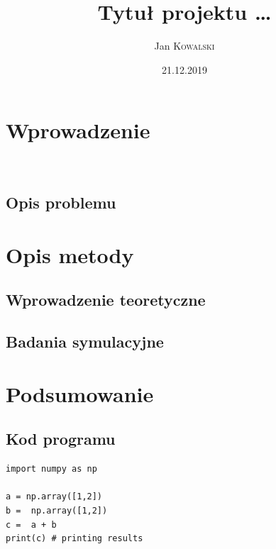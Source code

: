 \documentclass[11pt, a4paper, notitlepage]{report}
\author{Jan \textsc{Kowalski}}
\title{\textbf{Tytuł projektu \ldots}}
\date{21.12.2019}
\begin{document}
\clearpage\maketitle
\thispagestyle{empty}
\begin{abstract}
	\lipsum[3]
\end{abstract}

\clearpage \tableofcontents
\thispagestyle{empty}

\setcounter{page}{1}

\chapter{Wprowadzenie}
\lipsum[1]
\\
\lipsum[2]

\section{Opis problemu}
\lipsum[1-4]

\chapter{Opis metody}
\section{Wprowadzenie teoretyczne}
\lipsum[1]

\section{Badania symulacyjne}
\lipsum[1]

\chapter{Podsumowanie}
\lipsum[2]


\begin{appendices}
\chapter{Kod programu}
\begin{verbatim}
import numpy as np

a = np.array([1,2])
b =  np.array([1,2])
c =  a + b
print(c) # printing results
\end{verbatim}
\end{appendices}
\end{document}
